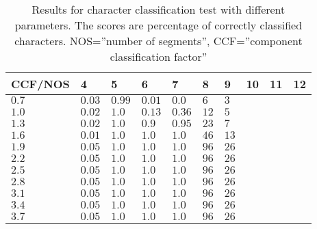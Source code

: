 \begin{table}[htb]
  \begin{center}
  \begin{tabular}{ l | l l l l l l l l l }
    CCF/NOS & 4 & 5  & 6 & 7  & 8 & 9 & 10 & 11 & 12 \\ \hline
    $0.7$  & $0.03$ & $0.99$ & $0.01$  & $0.0$  & $6$  & $3$\\ 
    $1.0$  & $0.02$ & $1.0$  & $0.13$  & $0.36$ & $12$ & $5$\\ 
    $1.3$  & $0.02$ & $1.0$  & $0.9$   & $0.95$ & $23$ & $7$\\
    $1.6$  & $0.01$ & $1.0$  & $1.0$   & $1.0$  & $46$ & $13$\\   
    $1.9$  & $0.05$ & $1.0$  & $1.0$   & $1.0$  & $96$ & $26$\\  
    $2.2$  & $0.05$ & $1.0$  & $1.0$   & $1.0$  & $96$ & $26$\\ 
    $2.5$ & $0.05$ & $1.0$  & $1.0$   & $1.0$  & $96$ & $26$\\ 
    $2.8$ & $0.05$ & $1.0$  & $1.0$   & $1.0$  & $96$ & $26$\\ 
    $3.1$ & $0.05$ & $1.0$  & $1.0$   & $1.0$  & $96$ & $26$\\ 
    $3.4$ & $0.05$ & $1.0$  & $1.0$   & $1.0$  & $96$ & $26$\\ 
    $3.7$ & $0.05$ & $1.0$  & $1.0$   & $1.0$  & $96$ & $26$\\ 
  \end{tabular}
\end{center}
\caption{Results for character classification test with different parameters. The scores are percentage of correctly classified characters.
	 NOS=''number of segments'',
         CCF=''component classification factor''}
\label{tab:word_classifier_results_generated_data} 
\end{table}
